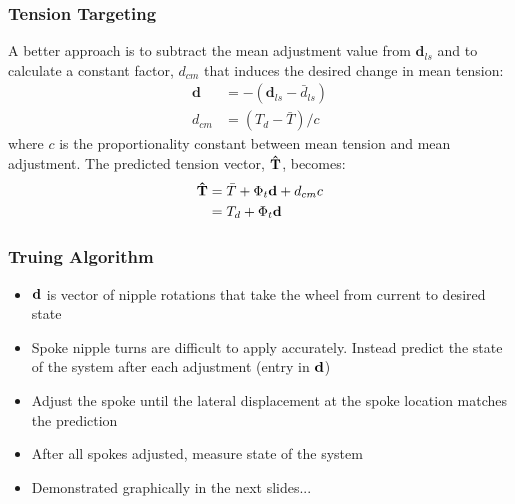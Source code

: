 \documentclass[mathserif]{beamer}
\begin{document}
\begin{frame}
        \frametitle{Tension Targeting}        
        A better approach is to subtract the mean adjustment value from $\mathbf{d}_{ls}$ and to calculate a constant factor, $d_{cm}$ that induces the desired change in mean tension:
        \begin{align*}
            \mathbf{d} &= -(\mathbf{d}_{ls} - \bar d_{ls})\\
            d_{cm} &=  (T_d - \bar T)/c
        \end{align*}
        where $c$ is the proportionality constant between mean tension and mean adjustment.  The predicted tension vector, $\bf \hat T$, becomes:
        \begin{align*}
            \bf \hat T &=  \bar T+\Phi_t{\bf d}+ d_{cm}c \\
            &= T_d + \Phi_t{\bf d}
        \end{align*}
\end{frame}

\begin{frame}
        \frametitle{Truing Algorithm}
        \begin{itemize}
          \item ${\bf d}$ is vector of nipple rotations that take the wheel from current to desired state
          \item Spoke nipple turns are difficult to apply accurately.  Instead predict the state of the system after each adjustment (entry in $\bf d$)
          \item Adjust the spoke until the lateral displacement at the spoke location matches the prediction
          \item After all spokes adjusted, measure state of the system
          \item Demonstrated graphically in the next slides...
        \end{itemize}
\end{frame}

\end{document}

